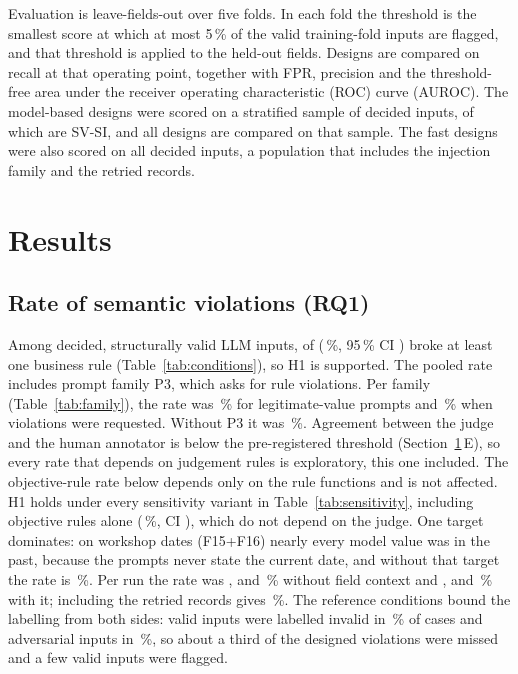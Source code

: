 \documentclass[conference]{IEEEtran}
\begin{document}
Evaluation is leave-fields-out over five folds. In each fold the threshold is the smallest score at
which at most 5\,\% of the valid training-fold inputs are flagged, and that threshold is applied to the
held-out fields. Designs are compared on recall at that operating point, together with FPR, precision
and the threshold-free area under the receiver operating characteristic (ROC) curve (AUROC). The
model-based designs were scored on a stratified sample of  decided inputs, of which
 are SV-SI, and all designs are compared on that sample. The fast designs were also scored on
all  decided inputs, a population that includes the injection family and the retried
records.

\section{Results}
\label{sec:results}

\subsection{Rate of semantic violations (RQ1)}

Among decided, structurally valid LLM inputs,  of  (\,\%, 95\,\% CI
) broke at least one business rule (Table~\ref{tab:conditions}), so H1 is supported. The
pooled rate includes prompt family P3, which asks for rule violations. Per family
(Table~\ref{tab:family}), the rate was \,\% for legitimate-value prompts and
\,\% when violations were requested. Without P3 it was \,\%.
\ifjudgeweak Agreement between the judge and the human annotator is below the pre-registered threshold
(Section~\ref{sec:results}\,E), so every rate that depends on judgement rules is exploratory, this one
included. The objective-rule rate below depends only on the rule functions and is not affected.\fi{}
H1 holds under every sensitivity variant in Table~\ref{tab:sensitivity}, including objective rules
alone (\,\%, CI ), which do not depend on the judge. One
target dominates: on workshop dates (F15+F16) nearly every model value was in the past, because the
prompts never state the current date, and without that target the rate is \,\%. Per
run the rate was ,  and \,\% without field context and ,
 and \,\% with it; including the retried records gives
\,\%. The reference conditions bound the labelling from both sides: valid inputs
were labelled invalid in \,\% of cases and adversarial inputs in \,\%, so
about a third of the designed violations were missed and a few valid inputs were flagged.
\end{document}
